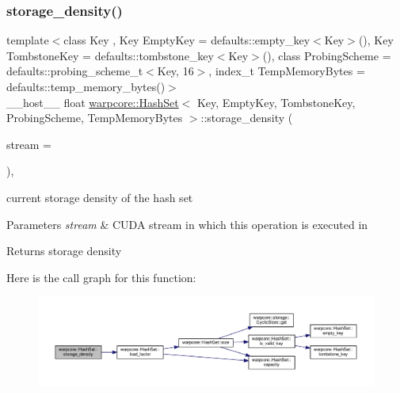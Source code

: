 \subsubsection{\texorpdfstring{storage\+\_\+density()}{storage\_density()}}
{\footnotesize\ttfamily template$<$class Key , Key Empty\+Key = defaults\+::empty\+\_\+key$<$\+Key$>$(), Key Tombstone\+Key = defaults\+::tombstone\+\_\+key$<$\+Key$>$(), class Probing\+Scheme  = defaults\+::probing\+\_\+scheme\+\_\+t$<$\+Key, 16$>$, index\+\_\+t Temp\+Memory\+Bytes = defaults\+::temp\+\_\+memory\+\_\+bytes()$>$ \\
\+\_\+\+\_\+host\+\_\+\+\_\+ float \hyperlink{classwarpcore_1_1HashSet}{warpcore\+::\+Hash\+Set}$<$ Key, Empty\+Key, Tombstone\+Key, Probing\+Scheme, Temp\+Memory\+Bytes $>$\+::storage\+\_\+density (\begin{DoxyParamCaption}\item[{cuda\+Stream\+\_\+t}]{stream = {} }\end{DoxyParamCaption})\hspace{0.3cm}{\ttfamily [inline]}, {\ttfamily [noexcept]}}



current storage density of the hash set 


\begin{DoxyParams}{Parameters}
{\em stream} & C\+U\+DA stream in which this operation is executed in \\
\hline
\end{DoxyParams}
\begin{DoxyReturn}{Returns}
storage density 
\end{DoxyReturn}
Here is the call graph for this function\+:
\nopagebreak
\begin{figure}[H]
\begin{center}
\leavevmode
\includegraphics[width=350pt]{classwarpcore_1_1HashSet_a11adf7a98c8686f220f2f556a810a211_cgraph}
\end{center}
\end{figure}
\mbox{\label{classwarpcore_1_1HashSet_af11b7b19315de5409098eaeb31702c63}} 
